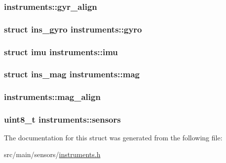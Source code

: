 \hypertarget{structinstruments_ad901b33930311133d1667a275c401190}{
\subsubsection[{gyr\+\_\+align}]{ instruments\+::gyr\+\_\+align}}\label{structinstruments_ad901b33930311133d1667a275c401190}
\hypertarget{structinstruments_adc4c5340ce0de66f85a34b6980d4b085}{
\subsubsection[{gyro}]{\setlength{\rightskip}{0pt plus 5cm}struct {\bf ins\+\_\+gyro} instruments\+::gyro}}\label{structinstruments_adc4c5340ce0de66f85a34b6980d4b085}
\hypertarget{structinstruments_afe040447f1269a7bef886e6011a2c213}{
\subsubsection[{imu}]{\setlength{\rightskip}{0pt plus 5cm}struct {\bf imu} instruments\+::imu}}\label{structinstruments_afe040447f1269a7bef886e6011a2c213}
\hypertarget{structinstruments_a171e6f2339806ab562614c75011b8ef7}{
\subsubsection[{mag}]{\setlength{\rightskip}{0pt plus 5cm}struct {\bf ins\+\_\+mag} instruments\+::mag}}\label{structinstruments_a171e6f2339806ab562614c75011b8ef7}
\hypertarget{structinstruments_ae19d2556b87015d9f7fe87cfe839af17}{
\subsubsection[{mag\+\_\+align}]{ instruments\+::mag\+\_\+align}}\label{structinstruments_ae19d2556b87015d9f7fe87cfe839af17}
\hypertarget{structinstruments_a2bed9c659453cb4f77736d16e41fe902}{
\subsubsection[{sensors}]{\setlength{\rightskip}{0pt plus 5cm}uint8\+\_\+t instruments\+::sensors}}\label{structinstruments_a2bed9c659453cb4f77736d16e41fe902}


The documentation for this struct was generated from the following file\+:\begin{DoxyCompactItemize}
\item 
src/main/sensors/\hyperlink{instruments_8h}{instruments.\+h}\end{DoxyCompactItemize}
